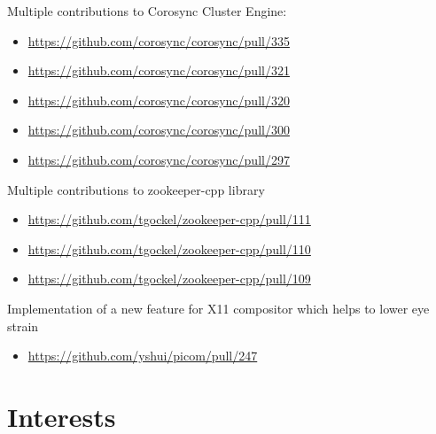 \documentclass[12]{article}
\begin{document}
{
Multiple contributions to Corosync Cluster Engine:
\begin{itemize}
	\item \url{https://github.com/corosync/corosync/pull/335}
	\item \url{https://github.com/corosync/corosync/pull/321}
	\item \url{https://github.com/corosync/corosync/pull/320}
	\item \url{https://github.com/corosync/corosync/pull/300}
	\item \url{https://github.com/corosync/corosync/pull/297}
\end{itemize}
}

{
Multiple contributions to zookeeper-cpp library
\begin{itemize}
	\item \url{https://github.com/tgockel/zookeeper-cpp/pull/111}
	\item \url{https://github.com/tgockel/zookeeper-cpp/pull/110}
	\item \url{https://github.com/tgockel/zookeeper-cpp/pull/109}
\end{itemize}
}

{
Implementation of a new feature for X11 compositor which helps to lower eye strain
\begin{itemize}
	\item \url{https://github.com/yshui/picom/pull/247}
\end{itemize}
}



\section{Interests}

\end{document}
